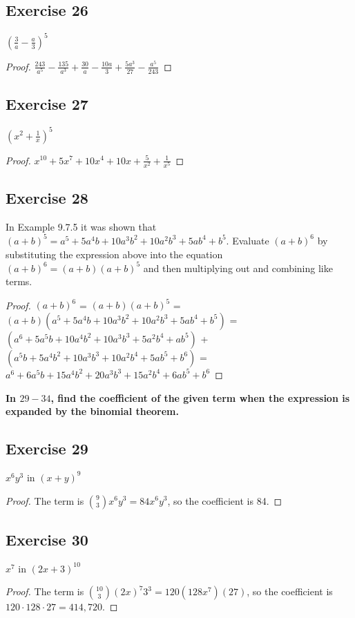 \documentclass[14pt]{extarticle}
\newcommand{\cy}{\color{cyan}}
\begin{document}
\subsection{Exercise 26}
\(\left(\frac{3}{a}-\frac{a}{3}\right)^5\)
\begin{proof}
\(\frac{243}{a^5} - \frac{135}{a^3} + \frac{30}{a} - \frac{10a}{3} + \frac{5a^3}{27} - \frac{a^5}{243}\)
\end{proof}

\subsection{Exercise 27}
\(\left(x^2+\frac{1}{x}\right)^5\)
\begin{proof}
\(x^{10} + 5x^7 + 10x^4 + 10x + \frac{5}{x^2} + \frac{1}{x^5}\)
\end{proof}

\subsection{Exercise 28}
In Example 9.7.5 it was shown that \((a + b)^5 = a^5 + 5a^4b + 10a^3b^2 + 10a^2b^3 + 5ab^4 + b^5\). Evaluate \((a + b)^6\) by 
substituting the expression above into the equation \((a + b)^6 = (a + b)(a + b)^5\) and then multiplying out and 
combining like terms.

\begin{proof}
\((a + b)^6\) = \((a + b)(a + b)^5\) = \((a+b)(a^5 + 5a^4b + 10a^3b^2 + 10a^2b^3 + 5ab^4 + b^5)\) = \((a^6 + 5a^5b + 
10a^4b^2 + 10a^3b^3 + 5a^2b^4 + ab^5)\) + \((a^5b + 5a^4b^2 + 10a^3b^3 + 10a^2b^4 + 5ab^5 + b^6)\) = \(a^6 + 6a^5b + 15a^4b^2 + 20a^3b^3 + 15a^2b^4 + 6ab^5 + b^6\)
\end{proof}

{\bf \cy In \(29-34\), find the coefficient of the given term when the expression is expanded by the binomial theorem.}

\subsection{Exercise 29}
\(x^6y^3\) in \((x+y)^9\)
\begin{proof}
The term is \(\binom{9}{3}x^6y^3 = 84x^6y^3\), so the coefficient is 84.
\end{proof}

\subsection{Exercise 30}
\(x^7\) in \((2x+3)^{10}\)
\begin{proof}
The term is \(\binom{10}{3}(2x)^7 3^3 = 120(128x^7)(27)\), so the coefficient is \(120 \cdot 128 \cdot 27 = 414,720\).
\end{proof}
\end{document}
